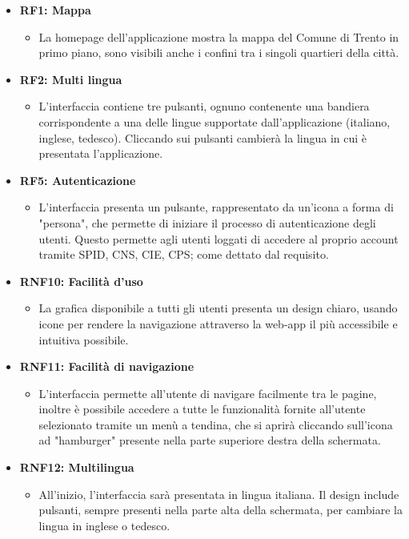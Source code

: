     \begin{itemize}
        \item \textbf{RF1: Mappa} \begin{itemize}
            \item La homepage dell'applicazione mostra la mappa del Comune di Trento in primo piano, sono visibili anche i confini tra i singoli quartieri della città.
        \end{itemize}
        \item \textbf{RF2: Multi lingua} \begin{itemize} 
                \item L'interfaccia contiene tre pulsanti, ognuno contenente una bandiera corrispondente a una delle lingue supportate dall'applicazione (italiano, inglese, tedesco). Cliccando sui pulsanti cambierà la lingua in cui è presentata l'applicazione.
        \end{itemize}
        \item \textbf{RF5: Autenticazione} \begin{itemize} 
            \item L'interfaccia presenta un pulsante, rappresentato da un'icona a forma di "persona", che permette di iniziare il processo di autenticazione degli utenti. Questo permette agli utenti loggati di accedere al proprio account tramite SPID, CNS, CIE, CPS; come dettato dal requisito.
        \end{itemize}
        \item \textbf{RNF10: Facilità d'uso} \begin{itemize}
                \item La grafica disponibile a tutti gli utenti presenta un design chiaro, usando icone per rendere la navigazione attraverso la web-app il più accessibile e intuitiva possibile.
        \end{itemize}
        \item \textbf{RNF11: Facilità di navigazione} \begin{itemize}
            \item L'interfaccia permette all'utente di navigare facilmente tra le pagine, inoltre è possibile accedere a tutte le funzionalità fornite all'utente selezionato tramite un menù a tendina, che si aprirà cliccando sull'icona ad "hamburger" presente nella parte superiore destra della schermata.
        \end{itemize}
        \item \textbf{RNF12: Multilingua} \begin{itemize} 
            \item All'inizio, l'interfaccia sarà presentata in lingua italiana. Il design include pulsanti, sempre presenti nella parte alta della schermata, per cambiare la lingua in inglese o tedesco.
        \end{itemize}
    \end{itemize}


